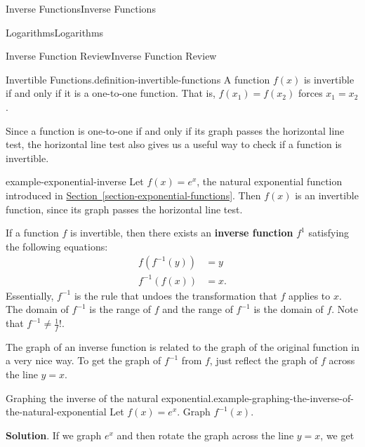 \documentclass[10pt,]{book}
\newcommand{\terminology}[1]{\textbf{#1}}
\numberwithin{equation}{section}
\begin{document}
\begin{chapterptx}{Inverse Functions}{}{Inverse Functions}{}{}
\begin{sectionptx}{Logarithms}{}{Logarithms}{}{}
\begin{subsectionptx}{Inverse Function Review}{}{Inverse Function Review}{}{}
\begin{definition}{Invertible Functions.}{definition-invertible-functions}
\hypertarget{p-199}{}%
A function \(f(x)\) is invertible if and only if it is a one-to-one function. That is, \(f(x_{1}) = f(x_{2})\) forces \(x_{1} = x_{2}\).%
\end{definition}
\hypertarget{p-200}{}%
Since a function is one-to-one if and only if its graph passes the horizontal line test, the horizontal line test also gives us a useful way to check if a function is invertible.%
\begin{example}{}{example-exponential-inverse}%
\hypertarget{p-201}{}%
Let \(f(x) = e^{x}\), the natural exponential function introduced in \hyperref[section-exponential-functions]{Section~\ref{section-exponential-functions}}. Then \(f(x)\) is an invertible function, since its graph passes the horizontal line test.%
\end{example}
\hypertarget{p-202}{}%
If a function \(f\) is invertible, then there exists an \terminology{inverse function} \(f^{1}\) satisfying the following equations:%
\begin{align*}
f(f^{-1}(y)) & = y \\
f^{-1}(f(x)) & = x. 
\end{align*}
Essentially, \(f^{-1}\) is the rule that undoes the transformation that \(f\) applies to \(x\). The domain of \(f^{-1}\) is the range of \(f\) and the range of \(f^{-1}\) is the domain of \(f\). Note that \(f^{-1}\neq\frac{1}{f}\)!.%
\par
\hypertarget{p-203}{}%
The graph of an inverse function is related to the graph of the original function in a very nice way. To get the graph of \(f^{-1}\) from \(f\), just reflect the graph of \(f\) across the line \(y=x\).%
\begin{example}{Graphing the inverse of the natural exponential.}{example-graphing-the-inverse-of-the-natural-exponential}%
\hypertarget{p-204}{}%
Let \(f(x) = e^{x}\). Graph \(f^{-1}(x)\).%
\par\smallskip%
\noindent\textbf{Solution}.\hypertarget{solution-44}{}\quad%
\hypertarget{p-205}{}%
If we graph \(e^{x}\) and then rotate the graph across the line \(y=x\), we get%
\begin{figure}
\centering
{
}
\end{figure}
\end{example}
\end{subsectionptx}
\end{sectionptx}
\end{chapterptx}
\end{document}
